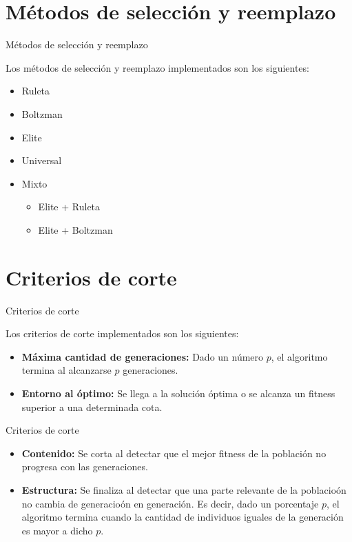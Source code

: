 \documentclass{beamer}
\begin{document}
\section{Métodos de selección y reemplazo}

\begin{frame}{Métodos de selección y reemplazo}
\par Los métodos de selección y reemplazo implementados son los siguientes:\\
\begin{itemize}
\item Ruleta
\item Boltzman
\item Elite
\item Universal
\item Mixto
\begin{itemize}
\item Elite + Ruleta
\item Elite + Boltzman
\end{itemize}
\end{itemize}
\end{frame}

\section{Criterios de corte}
\begin{frame}{Criterios de corte}

\par Los criterios de corte implementados son los siguientes:\\

\begin{itemize}
\item \textbf{Máxima cantidad de generaciones:} Dado un número $p$, el algoritmo termina al alcanzarse $p$ generaciones.
\item \textbf{Entorno al óptimo:} Se llega a la solución óptima o se alcanza un fitness superior a una determinada cota.
\end{itemize}
\end{frame}

\begin{frame}{Criterios de corte}
\begin{itemize}
\item \textbf{Contenido:} Se corta al detectar que el mejor fitness de la población no progresa con las generaciones.
\item \textbf{Estructura:} Se finaliza al detectar que una parte relevante de la poblacioón no cambia de generacioón en generación. Es decir, dado un porcentaje $p$, el algoritmo termina cuando la cantidad de individuos iguales de la generación es mayor a dicho $p$.
\end{itemize}
\end{frame}
\end{document}
